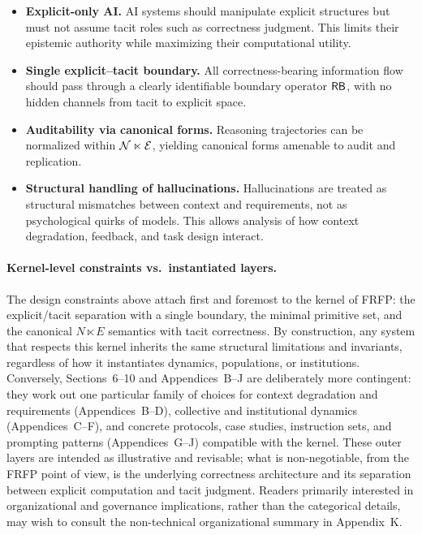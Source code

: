 \begin{itemize}[leftmargin=2em]
  \item \textbf{Explicit-only AI.} AI systems should manipulate explicit
        structures but must not assume tacit roles such as correctness
        judgment. This limits their epistemic authority while maximizing
        their computational utility.
  \item \textbf{Single explicit--tacit boundary.} All correctness-bearing
        information flow should pass through a clearly identifiable
        boundary operator \(\mathsf{RB}\), with no hidden channels from tacit
        to explicit space.
  \item \textbf{Auditability via canonical forms.} Reasoning trajectories
        can be normalized within \(\mathcal{N} \ltimes \mathcal{E}\), yielding
        canonical forms amenable to audit and replication.
  \item \textbf{Structural handling of hallucinations.} Hallucinations
        are treated as structural mismatches between context and
        requirements, not as psychological quirks of models. This allows
        analysis of how context degradation, feedback, and task design
        interact.
\end{itemize}

\paragraph{Kernel-level constraints vs.\ instantiated layers.}
The design constraints above attach first and
foremost to the kernel of FRFP: the explicit/tacit separation with a single boundary, the minimal
primitive set, and the canonical \(N \ltimes E\) semantics with tacit correctness. By construction, any
system that respects this kernel inherits the same structural limitations and invariants, regardless of
how it instantiates dynamics, populations, or institutions. Conversely, Sections~6–10 and
Appendices~B–J are deliberately more contingent: they work out one particular family of choices for
context degradation and requirements (Appendices~B–D), collective and institutional dynamics
(Appendices~C–F), and concrete protocols, case studies, instruction sets, and prompting patterns
(Appendices~G–J) compatible with the kernel. These outer layers are intended as illustrative and
revisable; what is non-negotiable, from the FRFP point of view, is the underlying correctness
architecture and its separation between explicit computation and tacit judgment. Readers primarily
interested in organizational and governance implications, rather than the categorical details, may wish
to consult the non-technical organizational summary in Appendix~K.

